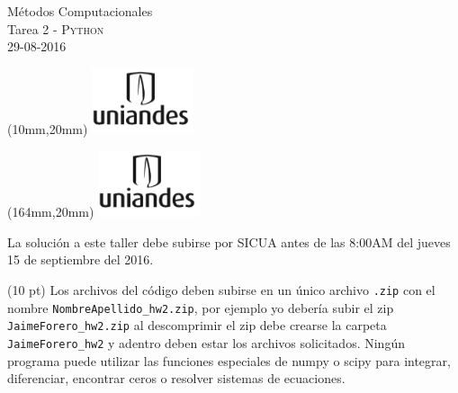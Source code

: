 \documentclass[11pt,letterpaper]{exam}
\begin{document}
\begin{center}
{\Large M\'etodos Computacionales} \\
Tarea 2 - \textsc{Python}\\
29-08-2016\\
\end{center}

\begin{textblock*}{40mm}(10mm,20mm)
  \includegraphics[width=3cm]{logoUniandes.png}
\end{textblock*}

\begin{textblock*}{40mm}(164mm,20mm)
  \includegraphics[width=3cm]{logoUniandes.png}
\end{textblock*}

\vspace{0.3cm}

\noindent
La solución a este taller debe subirse por SICUA antes de las 8:00AM
del jueves 15 de septiembre del 2016. 
\noindent

(10 pt) Los archivos del c\'odigo  deben subirse en un
\'unico archivo \verb".zip" con el nombre
\verb"NombreApellido_hw2.zip", por ejemplo yo deber\'ia subir el zip
\verb"JaimeForero_hw2.zip" al descomprimir el zip debe crearse la
carpeta \verb"JaimeForero_hw2" y adentro deben estar los archivos
solicitados.
Ning\'un programa puede utilizar las funciones especiales de numpy o
scipy para integrar, diferenciar, encontrar ceros o resolver sistemas
de ecuaciones. 


\vspace{0.3cm}
\end{document}
